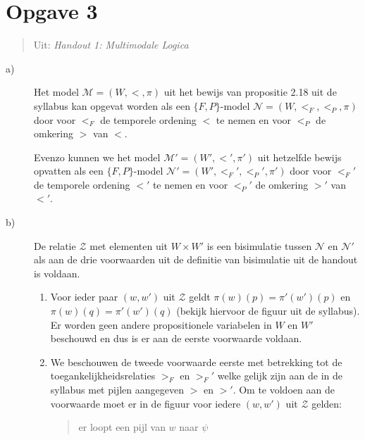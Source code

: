 \documentclass[a4paper,11pt]{article}
\begin{document}
\section*{Opgave 3}

\begin{quote}
Uit: \emph{Handout 1: Multimodale Logica}
\end{quote}

\begin{description}

\item[a)]

Het model $\mathcal{M} = (W,<,\pi)$ uit het bewijs van propositie 2.18 uit de
syllabus kan opgevat worden als een $\{F,P\}$-model $\mathcal{N} =
(W,<_{F},<_{P},\pi)$ door voor $<_{F}$ de temporele ordening $<$ te nemen en
voor $<_{P}$ de omkering $>$ van $<$.

Evenzo kunnen we het model $\mathcal{M'} = (W',<',\pi')$ uit hetzelfde bewijs
opvatten als een $\{F,P\}$-model $\mathcal{N'} = (W',<_{F}',<_{P}',\pi')$ door
voor $<_{F}'$ de temporele ordening $<'$ te nemen en voor $<_{P}'$ de omkering
$>'$ van $<'$.

\item[b)]

De relatie $\mathcal{Z}$ met elementen uit $W \times W'$ is een bisimulatie
tussen $\mathcal{N}$ en $\mathcal{N'}$ als aan de drie voorwaarden uit de
definitie van bisimulatie uit de handout is voldaan.

\begin{enumerate}

\item

Voor ieder paar $(w,w')$ uit $\mathcal{Z}$ geldt $\pi(w)(p) = \pi'(w')(p)$ en
$\pi(w)(q) = \pi'(w')(q)$ (bekijk hiervoor de figuur uit de syllabus). Er
worden geen andere propositionele variabelen in $W$ en $W'$ beschouwd en dus
is er aan de eerste voorwaarde voldaan.

\item

We beschouwen de tweede voorwaarde eerste met betrekking tot de
toegankelijkheidsrelaties $>_{F}$ en $>_{F}'$ welke gelijk zijn aan de in de
syllabus met pijlen aangegeven $>$ en $>'$. Om te voldoen aan de voorwaarde
moet er in de figuur voor iedere $(w,w')$ uit $\mathcal{Z}$ gelden:

\begin{quote}

er loopt een pijl van $w$ naar $\psi$


\end{quote}
\end{enumerate}
\end{description}
\end{document}
